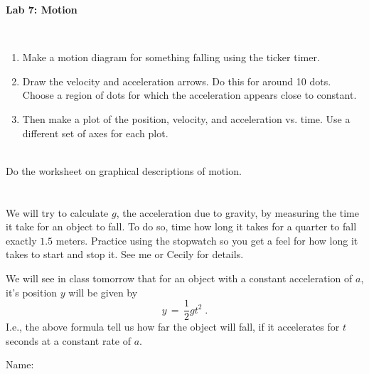 \documentclass[12pt]{article}
\begin{document}
\pagestyle{empty}

\begin{center}
{\large {\bf Lab 7: Motion}}\\
\smallskip 
\end{center}

\hspace{2mm}\\


\begin{enumerate}
   \item Make a motion diagram for something falling using the ticker
   timer. 
   \item Draw the velocity and acceleration arrows. Do this for around
   10 dots.  Choose a region of dots for which the acceleration appears
   close to constant.
   \item Then make a plot of the position, velocity, and acceleration
   vs. time. Use a different set of axes for each plot. \\ 
\end{enumerate}

\\

\noindent Do the worksheet on graphical descriptions of motion.\\

\hspace{2mm}\\

\\

\noindent We will try to calculate $g$, the acceleration due to
gravity, by measuring the time it take for an object to fall.
To do so, time how long it takes for a quarter to fall exactly $1.5$
meters.  Practice using the stopwatch so you get a feel for how long
it takes to start and stop it.  See me or Cecily for details.

We will see in class tomorrow that for an object with a constant
acceleration of $a$, it's position $y$ will be given by
\begin{equation}
  y \, = \, \frac{1}{2}gt^2 \;.
\end{equation}
I.e., the above formula tell us how far the object will fall, if it
accelerates for $t$ seconds at a constant rate of $a$. 

\newpage

Name:\\
\end{document}
